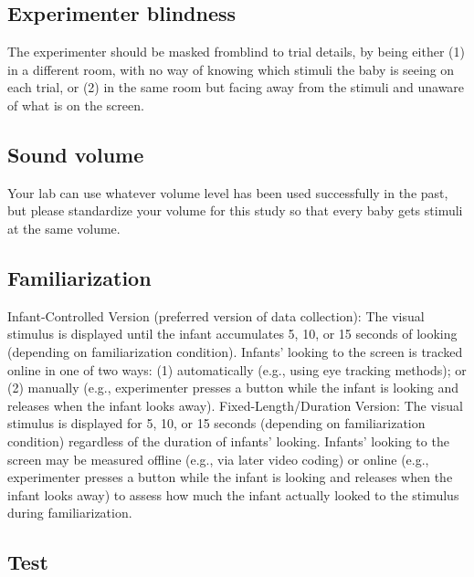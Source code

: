 \documentclass[
]{book}
\begin{document}
\hypertarget{experimenter-blindness}{%
\subsection{Experimenter blindness}\label{experimenter-blindness}}

The experimenter should be masked fromblind to trial details, by being either (1) in a different room, with no way of knowing which stimuli the baby is seeing on each trial, or (2) in the same room but facing away from the stimuli and unaware of what is on the screen.

\hypertarget{sound-volume}{%
\subsection{Sound volume}\label{sound-volume}}

Your lab can use whatever volume level has been used successfully in the past, but please standardize your volume for this study so that every baby gets stimuli at the same volume.

\hypertarget{familiarization}{%
\subsection{Familiarization}\label{familiarization}}

Infant-Controlled Version (preferred version of data collection):
The visual stimulus is displayed until the infant accumulates 5, 10, or 15 seconds of looking (depending on familiarization condition). Infants' looking to the screen is tracked online in one of two ways: (1) automatically (e.g., using eye tracking methods); or (2) manually (e.g., experimenter presses a button while the infant is looking and releases when the infant looks away).
Fixed-Length/Duration Version:
The visual stimulus is displayed for 5, 10, or 15 seconds (depending on familiarization condition) regardless of the duration of infants' looking. Infants' looking to the screen may be measured offline (e.g., via later video coding) or online (e.g., experimenter presses a button while the infant is looking and releases when the infant looks away) to assess how much the infant actually looked to the stimulus during familiarization.

\hypertarget{test}{%
\subsection{Test}\label{test}}
\end{document}
